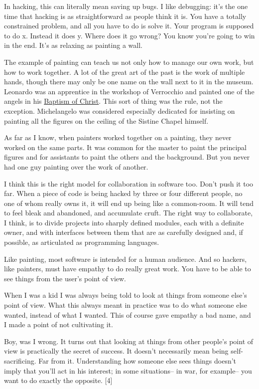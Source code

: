 In hacking, this can literally mean saving up bugs. I like debugging:
it's the one time that hacking is as straightforward as people think it
is. You have a totally constrained problem, and all you have to do is
solve it. Your program is supposed to do x. Instead it does y. Where
does it go wrong? You know you're going to win in the end. It's as
relaxing as painting a wall.

The example of painting can teach us not only how to manage our own
work, but how to work together. A lot of the great art of the past is
the work of multiple hands, though there may only be one name on the
wall next to it in the museum. Leonardo was an apprentice in the
workshop of Verrocchio and painted one of the angels in his
\href{baptism.html}{Baptism of Christ}. This sort of thing was the rule,
not the exception. Michelangelo was considered especially dedicated for
insisting on painting all the figures on the ceiling of the Sistine
Chapel himself.

As far as I know, when painters worked together on a painting, they
never worked on the same parts. It was common for the master to paint
the principal figures and for assistants to paint the others and the
background. But you never had one guy painting over the work of another.

I think this is the right model for collaboration in software too. Don't
push it too far. When a piece of code is being hacked by three or four
different people, no one of whom really owns it, it will end up being
like a common-room. It will tend to feel bleak and abandoned, and
accumulate cruft. The right way to collaborate, I think, is to divide
projects into sharply defined modules, each with a definite owner, and
with interfaces between them that are as carefully designed and, if
possible, as articulated as programming languages.

Like painting, most software is intended for a human audience. And so
hackers, like painters, must have empathy to do really great work. You
have to be able to see things from the user's point of view.

When I was a kid I was always being told to look at things from someone
else's point of view. What this always meant in practice was to do what
someone else wanted, instead of what I wanted. This of course gave
empathy a bad name, and I made a point of not cultivating it.

Boy, was I wrong. It turns out that looking at things from other
people's point of view is practically the secret of success. It doesn't
necessarily mean being self-sacrificing. Far from it. Understanding how
someone else sees things doesn't imply that you'll act in his interest;
in some situations-- in war, for example-- you want to do exactly the
opposite. {[}4{]}

